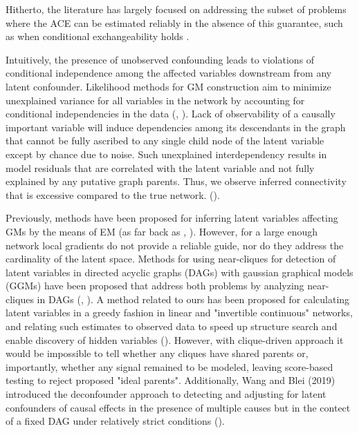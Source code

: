 \documentclass{article}
\begin{document}
Hitherto, the literature has largely focused on addressing the subset of problems where the ACE can be estimated reliably in the absence of this guarantee, such as when conditional exchangeability holds \cite{hernan_estimating_2006}.  

Intuitively, the presence of unobserved confounding leads to violations of conditional independence among the affected variables downstream from any latent confounder.  Likelihood methods for GM construction aim to minimize unexplained variance for all variables in the network by accounting for conditional independencies in the data (\cite{pearl_causality:_2000}, \cite{friedman_being_2013}).  Lack of observability of a causally important variable will induce dependencies among its descendants in the graph that cannot be fully ascribed to any single child node of the latent variable except by chance due to noise.  Such unexplained interdependency results in model residuals that are correlated with the latent variable and not fully explained by any putative graph parents. Thus, we observe inferred connectivity that is excessive compared to the true network.  (\cite{elidan_discovering_2001}).  

Previously, methods have been proposed for inferring latent variables affecting GMs by the means of EM (as far back as \cite{friedman1997learning}, \cite{friedman1998bayesian}).  However, for a large enough network local gradients do not provide a reliable guide, nor do they address the cardinality of the latent space.  Methods for using near-cliques for detection of latent variables in directed acyclic graphs (DAGs) with gaussian graphical models (GGMs) have been proposed that address both problems by analyzing near-cliques in DAGs (\cite{elidan_discovering_2001}, \cite{silva_learning_2006}).  A method related to ours has been proposed for calculating latent variables in a greedy fashion in linear and "invertible continuous" networks, and relating such estimates to observed data to speed up structure search and enable discovery of hidden variables (\cite{elidan_ideal_2007}). However, with clique-driven approach it would be impossible to tell whether any cliques have shared parents or, importantly, whether any signal remained to be modeled, leaving score-based testing to reject proposed "ideal parents". Additionally, Wang and Blei (2019) introduced the deconfounder approach to detecting and adjusting for latent confounders of causal effects in the presence of multiple causes but in the contect of a fixed DAG under relatively strict conditions (\cite{wang_deconfounder_2019}). 
\end{document}
